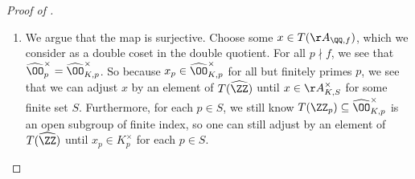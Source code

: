 \documentclass[../notes.tex]{subfiles}
\begin{document}
\begin{proof}[Proof of ]
\begin{enumerate}
		We would like to check that the element in $T(\QQ)\backslash T(\AA_{\QQ,f})/T(\widehat\ZZ)$ depends only on the choice of Cartier divisor. We go through our choices one at a time.
		\begin{itemize}
			\item Choosing a different neighborhood $U_p'$ of $p$ will adjust $\alpha_{0p}$ to some $\alpha_{0p'}$. However, $\alpha_{0p}=\alpha_{p'p}\alpha_{0p'}$ by the cocycle condition, and $\alpha_{p'p}\in\OO_p^\times$ (because $p\in U_p\cap U_p'$), so this only adjusts this coordinate by an element of $\OO_p^\times\subseteq T(\ZZ_p)$, which is legal. Thus, the tuple is well-defined in $T(\AA_{\QQ,f})/T(\widehat\ZZ)$.
			\item Shrinking $U_0$ by (say) removing a prime $q$ adds a new coordinate $\alpha_{0q}$. However, $\alpha_{0q}\in T(\ZZ_q)$ because $\alpha_{0q}$ began as providing an isomorphism $\OO_{U_0}\to\OO_{U_0}$ and hence lives in $\OO_{U_0}^\times\subseteq\OO_q^\times$. Thus, the tuple is well-defined in $T(\AA_{\QQ,f})/T(\widehat\ZZ)$.
			\item We explain that changing $U_0$ to some different $U_0'\in\mc U$ will not change the class. The previous check explains that we may shrink both $U_0$ and $U_0'$ to not adjust the class, so we may assume that $U_0$ and $U_0'$ are equal as sets. Then there is some $\alpha_{00'}\in T(\QQ)$ which allows us to identify $\alpha_{0p}=\alpha_{0'p}\alpha_{00'}$. Thus, the entire tuple is still well-defined in $T(\QQ)\backslash T(\AA_{\QQ,f})/T(\widehat\ZZ)$.
		\end{itemize}
		While we're here, we note that the above checks also explain that our map from Cartier divisors to the double quotient is well-defined up to refining the open cover of the Cartier divisor. Because isomorphisms of Cartier divisors really amount to the existence of a common refinement (by tracking through the comments in the previous step), we see that we have in fact defined a map $\op{Cl}(\OO)\to T(\QQ)\backslash T(\AA_{\QQ,f})/T(\widehat\ZZ)$.

		\item We argue that the map is surjective. Choose some $x\in T(\AA_{\QQ,f})$, which we consider as a double coset in the double quotient. For all $p\nmid f$, we see that $\widehat\OO_p^\times=\widehat\OO_{K,p}^\times$. So because $x_p\in\widehat\OO_{K,p}^\times$ for all but finitely primes $p$, we see that we can adjust $x$ by an element of $T(\widehat\ZZ)$ until $x\in\AA_{K,S}^\times$ for some finite set $S$. Furthermore, for each $p\in S$, we still know $T(\ZZ_p)\subseteq\widehat\OO_{K,p}^\times$ is an open subgroup of finite index, so one can still adjust by an element of $T(\widehat\ZZ)$ until $x_p\in K_p^\times$ for each $p\in S$.


\end{enumerate}
\end{proof}
\end{document}
